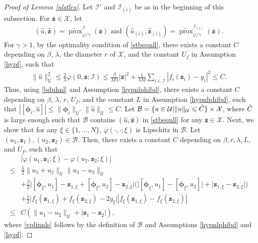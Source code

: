 \documentclass[10pt,reqno]{amsart}
\newcommand{\1}{{\chi}}
\def\leq{\leqslant}
\numberwithin{equation}{section}
\theoremstyle{thmlemcorr}
\numberwithin{theorem}{section}
\theoremstyle{thmlemcorr*}
\theoremstyle{defi}
\theoremstyle{remexample}
\theoremstyle{ass}
\begin{document}
\begin{proof}[Proof of Lemma \ref{nlstles}]
	Let ${\mathcal{I}}' $ and ${\mathcal{I}}_{(i)}$ be  as in the beginning of this subsection. For $\bar{\boldsymbol{z}}\in \mathcal{X}$, let 
	\begin{align}
		(\hat{u}, \hat{\boldsymbol{z}}) = \widetilde{\operatorname{prox}}_{\varphi/\gamma}^{\mathcal{I}}(\bar{\boldsymbol{z}}) \text{ and }
		(\hat{u}_{(i)}, \hat{\boldsymbol{z}}_{(i)}) = \widetilde{\operatorname{prox}}_{\varphi/\gamma}^{{\mathcal{I}}_{(i)}}(\bar{\boldsymbol{z}}). \label{stbeqnll}
	\end{align}
	For $\gamma>1$, by the optimality condition of \eqref{stbeqnll}, there exists a constant $C$ depending on $\beta$, $\lambda$,  the diameter $r$ of $\mathcal{X}$, and the constant $U_f$ in Assumption \ref{hypf}, such that 
	\begin{align}
		\label{bduhnl}
		\|\hat{u}\|_{\mathcal{U}}^2\leq \frac{2}{\lambda}\varphi(0, \bar{\boldsymbol{z}};{\mathcal{I}})\leq \frac{\beta}{M\lambda}|\bar{\boldsymbol{z}}|^2+\frac{1}{\lambda M}\sum_{i\in \mathcal{I}}|f_i(\bar{\boldsymbol{z}}_i)-y_i|^2\leq C.
	\end{align}
	Thus, using \eqref{bduhnl} and Assumption \ref{hypnlphibd}, there exists a constant $C$ depending on $\beta$, $\lambda$, $r$, $U_f$, and the constant $L$ in Assumption \ref{hypnlphibd}, such that 
	$|[\boldsymbol{\phi}_i, \hat{u}]|\leq \|\boldsymbol{\phi}_i\|_{\mathcal{U}^*}\|\hat{u}\|_{\mathcal{U}}\leq C$. 
	Let $\mathcal{B}=\{u\in \mathcal{U}|\|u\|_{\mathcal{U}} \leq \Tilde{C}\}\times \mathcal{X}$, where $\Tilde{C}$ is large enough  such that $\mathcal{B}$ contains $(\hat{u}, \hat{\boldsymbol{z}})$ in \eqref{stbeqnll} for any $\bar{\boldsymbol{z}}\in \mathcal{X}$. 
	Next, we show that for any $\xi\in \{1, \dots, N\}$, $\varphi(\cdot, \cdot;\xi)$ is Lipschitz in $\mathcal{B}$.  Let $(u_1, \boldsymbol{z}_1), (u_2, \boldsymbol{z}_2) \in \mathcal{B}$. Then,  there exists a constant $C$ depending on $\beta, r, \lambda, L$, and ${U}_f$,  such that 
	\begin{align}
		&|\varphi(u_1, \boldsymbol{z}_1; \xi) - \varphi(u_2, \boldsymbol{z}_2; \xi)|\nonumber\\
		\leq&  \frac{\lambda}{2}\|u_1 + u_2\|_{\mathcal{U}}\|u_1 - u_2\|_{\mathcal{U}}\nonumber
		\\
		&+ 
		\frac{\beta}{2}\bigg|[\boldsymbol{\phi}_{\xi}, u_1] - \boldsymbol{z}_{1, \xi}+[\boldsymbol{\phi}_{\xi}, u_2]-\boldsymbol{z}_{2,\xi} \bigg|\bigg(\big|[\boldsymbol{\phi}_{\xi}, u_1]-[\boldsymbol{\phi}_{\xi}, u_2] \big| + \big| \boldsymbol{z}_{1,\xi}-\boldsymbol{z}_{2,\xi} \big| \bigg)\nonumber\\
		&+ \frac{1}{2}\big|f_{\xi}(\boldsymbol{z}_{1,\xi})+f_{\xi}(\boldsymbol{z}_{2,\xi})-2y_{\xi}\big| |f_{\xi}(\boldsymbol{z}_{1,\xi}) - f_{\xi}(\boldsymbol{z}_{2, \xi})|\nonumber \\
		\leq & C(\|u_1 - u_2\|_{\mathcal{U}} + |\boldsymbol{z}_1 - \boldsymbol{z}_2|), \label{vplinnls}
	\end{align} 
	where \eqref{vplinnls} follows by the definition of $\mathcal{B}$ and Assumptions \ref{hypnlphibd} and \ref{hypf}. 
	

\end{proof}
\end{document}
